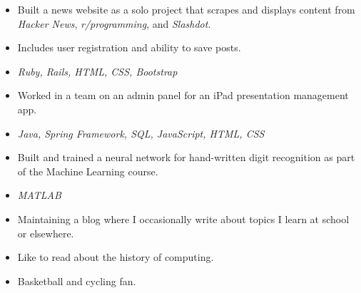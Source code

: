 


\begin{itemize}
	\item Built a news website as a solo project that scrapes and displays content from \textit{Hacker News}, \textit{r/programming}, and \textit{Slashdot}.
	\item Includes user registration and ability to save posts.
	\item \textit{Ruby, Rails, HTML, CSS, Bootstrap}
\end{itemize}

\begin{itemize}
    \item Worked in a team on an admin panel for an iPad presentation management app.
    \item \textit{Java, Spring Framework, SQL, JavaScript, HTML, CSS}
\end{itemize}

\begin{itemize}
    \item Built and trained a neural network for hand-written digit recognition as part of the Machine Learning course.
    \item \textit{MATLAB}
\end{itemize}


\divider

\divider


\begin{itemize}
\item Maintaining a blog where I occasionally write about topics I learn at school or elsewhere.
\item Like to read about the history of computing.
\item Basketball and cycling fan.
\end{itemize}
    

